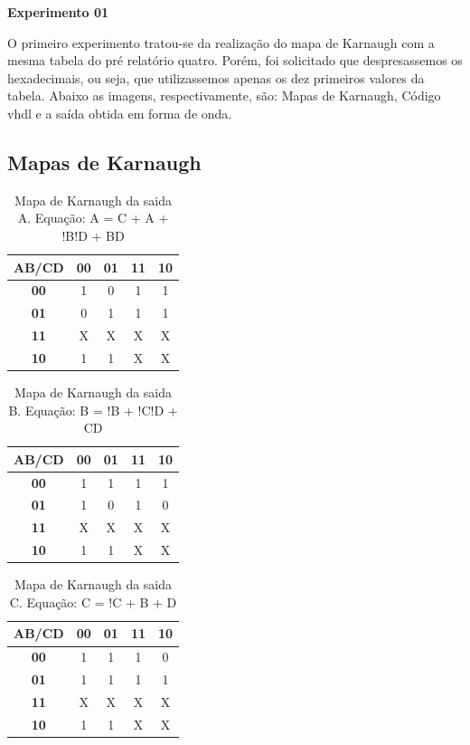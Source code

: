 \documentclass[12pts]{article}
\begin{document}
\textbf{Experimento 01}
\singlespacing

	O primeiro experimento tratou-se da realização do mapa de Karnaugh com a mesma tabela do pré relatório quatro. Porém, foi solicitado que despresassemos os hexadecimais, ou seja, que utilizassemos apenas os dez primeiros valores da tabela. Abaixo as imagens, respectivamente, são: Mapas de Karnaugh, Código vhdl e a saída obtida em forma de onda.
\singlespacing

	\subsection{Mapas de Karnaugh}

	\begin{table}[h]
	\centering	
	\begin{tabular}{|c|c|c|c|c|}
		\hline
		\textbf{AB/CD} & \textbf{00} & \textbf{01} & \textbf{11} & \textbf{10}\\
		\hline
		\textbf{00} & 1 & 0 & 1 & 1\\
		\hline
		\textbf{01} & 0 & 1 & 1 & 1\\
		\hline
		\textbf{11} & X & X & X & X\\
		\hline
		\textbf{10} & 1 & 1 & X & X\\
		\hline
	\end{tabular}
	\caption{Mapa de Karnaugh da saida A. Equação: A = C + A + !B!D + BD }
	\end{table}
	\singlespacing


	\begin{table}[h]
	\centering	
	\begin{tabular}{|c|c|c|c|c|}
			\hline
		\textbf{AB/CD} & \textbf{00} & \textbf{01} & \textbf{11} & \textbf{10}\\
		\hline
		\textbf{00} & 1 & 1 & 1 & 1\\
		\hline
		\textbf{01} & 1 & 0 & 1 & 0\\
		\hline
		\textbf{11} & X & X & X & X\\
		\hline
		\textbf{10} & 1 & 1 & X & X\\
		\hline
	\end{tabular}
	\caption{Mapa de Karnaugh da saida B. Equação: B = !B + !C!D + CD }
	\end{table}
	\singlespacing

	\newpage

	\begin{table}[h]
	\centering	
	\begin{tabular}{|c|c|c|c|c|}
	\hline
		\textbf{AB/CD} & \textbf{00} & \textbf{01} & \textbf{11} & \textbf{10}\\
		\hline
		\textbf{00} & 1 & 1 & 1 & 0\\
		\hline
		\textbf{01} & 1 & 1 & 1 & 1\\
		\hline
		\textbf{11} & X & X & X & X\\
		\hline
		\textbf{10} & 1 & 1 & X & X\\
		\hline
	\end{tabular}
	\caption{Mapa de Karnaugh da saida C. Equação: C = !C + B + D }
	\end{table}
	\singlespacing
\end{document}
